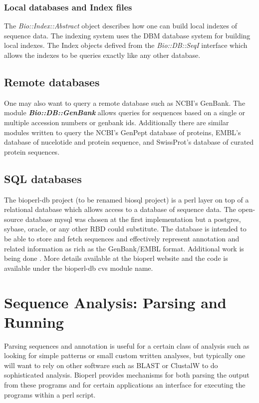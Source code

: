 \documentclass{article}
\begin{document}
\subsubsection{Local databases and Index files}
The \emph{Bio::Index::Abstract} object describes how one can build
local indexes of sequence data.  The indexing system uses the DBM
database system for building local indexes.  The Index objects defived
from the \emph{Bio::DB::SeqI} interface which allows the indexes to be
queries exactly like any other database.

\subsection{Remote databases}
One may also want to query a remote database such as NCBI's GenBank.
The module \emph{\bf Bio::DB::GenBank} allows queries for sequences
based on a single or multiple accession numbers or genbank ids.
Additionally there are similar modules written to query the NCBI's
GenPept database of proteins, EMBL's database of nucelotide and
protein sequence, and SwissProt's database of curated protein sequences.

\subsection{SQL databases}

The bioperl-db project (to be renamed biosql project) is a perl layer
on top of a relational database which allows access to a database of
sequence data.  The open-source database mysql was
chosen at the first implementation but a postgres, sybase, oracle, or
any other RBD could substitute.  The database is intended to be able
to store and fetch sequences and effectively represent annotation and
related information as rich as the GenBank/EMBL format.  Additional
work is being done .  More details available at the bioperl website
and the code is available under the bioperl-db cvs module name. 

\section{Sequence Analysis: Parsing and Running}

Parsing sequences and annotation is useful for a certain class of
analysis such as looking for simple patterns or small custom written
analyses, but typically one will want to rely on other software such
as BLAST or ClustalW to do sophisticated analysis.  Bioperl provides
mechanisms for both parsing the output from these programs and for
certain applications an interface for executing the programs within a
perl script.
\end{document}
